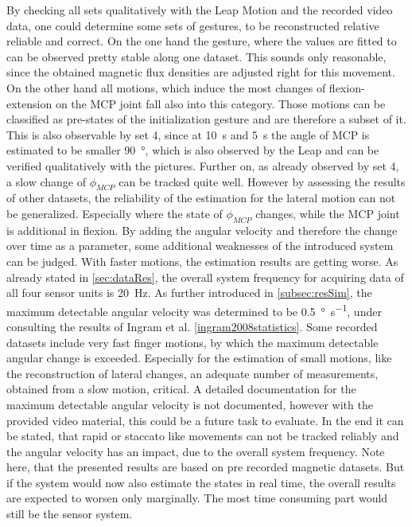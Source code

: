 By checking all sets qualitatively with the Leap Motion and the recorded video data, one could determine some sets of gestures, to be reconstructed relative reliable and correct. On the one hand the gesture, where the values are fitted to can be observed pretty stable along one dataset. This sounds only reasonable, since the obtained magnetic flux densities are adjusted right for this movement. On the other hand all motions, which induce the most changes of flexion-extension on the \ac{MCP} joint fall also into this category. Those motions can be classified as pre-states of the initialization gesture and are therefore a subset of it. This is also observable by set 4, since at \SI{10}{\second} and \SI{5}{\second} the angle of \ac{MCP} is estimated to be smaller \SI{90}{\degree}, which is also observed by the Leap and can be verified qualitatively with the pictures. Further on, as already observed by set 4, a slow change of $ \phi_{MCP} $ can be tracked quite well. 
However by assessing the results of other datasets, the reliability of the estimation for the lateral motion can not be generalized. Especially where the state of $ \phi_{MCP} $ changes, while the \ac{MCP} joint is additional in flexion. 
By adding the angular velocity and therefore the change over time as a parameter, some additional weaknesses of the introduced system can be judged. With faster motions, the estimation results are getting worse. As already stated in \ref{sec:dataRes}, the overall system frequency for acquiring data of all four sensor units is \SI{20}{\Hz}. As further introduced in \ref{subsec:resSim}, the maximum detectable angular velocity was determined to be \SI[per-mode=symbol]{0.5}{\degree \per \second}, under consulting the results of Ingram et al. \ref{ingram2008statistics}. Some recorded datasets include very fast finger motions, by which the maximum detectable angular change is exceeded. Especially for the estimation of small motions, like the reconstruction of lateral changes, an adequate number of measurements, obtained from a slow motion, critical. A detailed documentation for the maximum detectable angular velocity is not documented, however with the provided video material, this could be a future task to evaluate. In the end it can be stated, that rapid or staccato like movements can not be tracked reliably and the angular velocity has an impact, due to the overall system frequency. Note here, that the presented results are based on pre recorded magnetic datasets. But if the system would now also estimate the states in real time, the overall results are expected to worsen only marginally. The most time consuming part would still be the sensor system. 

